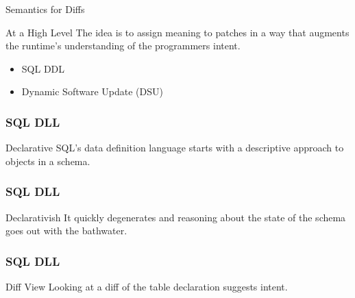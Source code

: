 \documentclass{beamer}
\begin{document}
\begin{frame}{Semantics for Diffs}
  \begin{block}{At a High Level}
    The idea is to assign meaning to patches in a way that augments the runtime's understanding of the programmers intent.

    \begin{itemize}
      \item SQL DDL
      \item Dynamic Software Update (DSU)
    \end{itemize}
  \end{block}
\end{frame}

\begin{frame}[fragile]
  \frametitle{SQL DLL}
  \begin{block}{Declarative}
    SQL's data definition language starts with a descriptive approach to objects in a schema.
  \end{block}

  \begin{example}
    
  \end{example}
\end{frame}

\begin{frame}[fragile]
  \frametitle{SQL DLL}
  \begin{block}{Declarativish}
    It quickly degenerates and reasoning about the state of the schema goes out with the bathwater.
  \end{block}

  \begin{example}
    
  \end{example}
\end{frame}

\begin{frame}[fragile]
  \frametitle{SQL DLL}
  \begin{block}{Diff View}
    Looking at a diff of the table declaration suggests intent.
  \end{block}

  \begin{example}
    \begin{center}
      \begin{minipage}{.44\textwidth}
        
      \end{minipage}
      \hfill
      \begin{minipage}{.48\textwidth}
        
      \end{minipage}
    \end{center}
  \end{example}
\end{frame}
\end{document}
